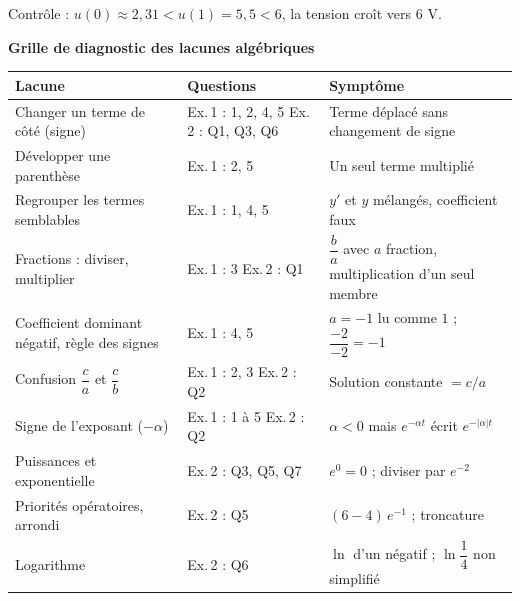 \documentclass[a4paper,11pt]{article}
\begin{document}
Contrôle : $u(0) \approx 2{,}31 < u(1) = 5{,}5 < 6$, la tension croît vers $6$ V.

\needspace{9cm}
\begin{tcolorbox}[colback=uimmlightblue, colframe=uimmblue, boxrule=0.8pt, arc=2pt, left=6pt, right=6pt, top=3pt, bottom=3pt]
{\color{uimmblue}\bfseries Grille de diagnostic des lacunes algébriques}
\end{tcolorbox}
\small
\renewcommand{\arraystretch}{1.35}
\noindent\begin{tabularx}{\textwidth}{|>{\raggedright\arraybackslash}p{4.9cm}|>{\raggedright\arraybackslash}p{3.3cm}|>{\raggedright\arraybackslash}X|}
\hline
\rowcolor{uimmlightblue}\textbf{Lacune} & \textbf{Questions} & \textbf{Symptôme} \\
\hline
Changer un terme de côté (signe) & Ex.\,1 : 1, 2, 4, 5 \newline Ex.\,2 : Q1, Q3, Q6 & Terme déplacé sans changement de signe \\
\hline
Développer une parenthèse & Ex.\,1 : 2, 5 & Un seul terme multiplié \\
\hline
Regrouper les termes semblables & Ex.\,1 : 1, 4, 5 & $y'$ et $y$ mélangés, coefficient faux \\
\hline
Fractions : diviser, multiplier & Ex.\,1 : 3 \newline Ex.\,2 : Q1 & $\dfrac{b}{a}$ avec $a$ fraction, multiplication d'un seul membre \\
\hline
Coefficient dominant négatif, règle des signes & Ex.\,1 : 4, 5 & $a = -1$ lu comme $1$ ; $\dfrac{-2}{-2} = -1$ \\
\hline
Confusion $\dfrac{c}{a}$ et $\dfrac{c}{b}$ & Ex.\,1 : 2, 3 \newline Ex.\,2 : Q2 & Solution constante $= c/a$ \\
\hline
Signe de l'exposant ($-\alpha$) & Ex.\,1 : 1 à 5 \newline Ex.\,2 : Q2 & $\alpha < 0$ mais $e^{-\alpha t}$ écrit $e^{-|\alpha| t}$ \\
\hline
Puissances et exponentielle & Ex.\,2 : Q3, Q5, Q7 & $e^{0} = 0$ ; diviser par $e^{-2}$ \\
\hline
Priorités opératoires, arrondi & Ex.\,2 : Q5 & $(6-4)\,e^{-1}$ ; troncature \\
\hline
Logarithme & Ex.\,2 : Q6 & $\ln$ d'un négatif ; $\ln\dfrac{1}{4}$ non simplifié \\
\hline
\end{tabularx}
\end{document}
